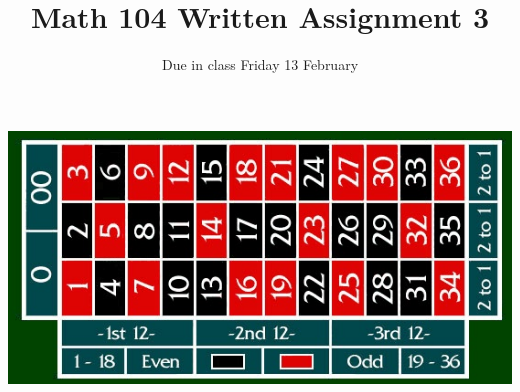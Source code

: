 \documentclass[12pt]{article}
\author{}\date{Due in class Friday 13 February}
\title{Math 104 Written Assignment 3}\author{}
\begin{document}
\maketitle
\pagestyle{empty}

\begin{center}\includegraphics[scale=.3]{RouletteLayout}\end{center}
\end{document}
